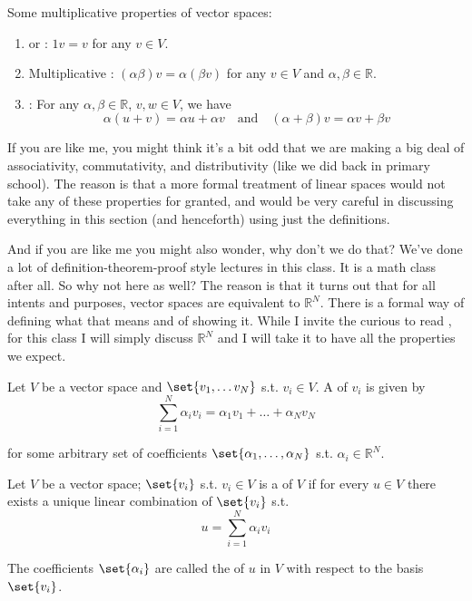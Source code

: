 \documentclass{article}
\begin{document}
Some multiplicative properties of vector spaces:
\begin{enumerate}
  \item {} or : $1 v = v$ for any $v \in V$.
  \item Multiplicative : $(\alpha \beta) v = \alpha (\beta v)$ for any $v \in V$ and $\alpha, \beta \in \mathbb{R}$.
  \item {}: For any $\alpha, \beta \in \mathbb{R}$, $v, w \in V$, we have
    \[
      \alpha (u + v) = \alpha u + \alpha v
      \quad
      \text{and}
      \quad
      (\alpha + \beta) v = \alpha v + \beta v
    \]
\end{enumerate}

\begin{remark}
  If you are like me, you might think it's a bit odd that we are making a big deal of associativity, commutativity, and distributivity (like we did back in primary school). The reason is that a more formal treatment of linear spaces would not take any of these properties for granted, and would be very careful in discussing everything in this section (and henceforth) using just the definitions.

  And if you are like me you might also wonder, why don't we do that? We've done a lot of definition-theorem-proof style lectures in this class. It is a math class after all. So why not here as well? The reason is that it turns out that for all intents and purposes, vector spaces are equivalent to $\mathbb{R}^N$. There is a formal way of defining what that means and of showing it. While I invite the curious to read , for this class I will simply discuss $\mathbb{R}^N$ and I will take it to have all the properties we expect.
\end{remark}

\begin{definition}
  Let $V$ be a vector space and $\set{v_1, \ldots v_N}$ s.t. $v_i \in V$. A  of $v_i$ is given by
  \[
    \sum^{N}_{i = 1} \alpha_i v_i = \alpha_1 v_1 + \ldots + \alpha_N v_N
  \]

  for some arbitrary set of coefficients $\set{\alpha_1, \ldots, \alpha_N}$ s.t. $\alpha_i \in \mathbb{R}^N$.
\end{definition}

\begin{definition}
  Let $V$ be a vector space; $\set{v_i}$ s.t. $v_i \in V$ is a  of $V$ if for every $u \in V$ there exists a unique linear combination of $\set{v_i}$ s.t.
  \[
    u = \sum^{N}_{i = 1} \alpha_i v_i
  \]

  The coefficients $\set{\alpha_i}$ are called the  of $u$ in $V$ with respect to the basis $\set{v_i}$.
\end{definition}
\end{document}
